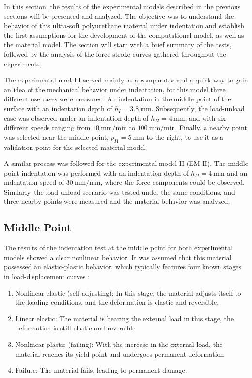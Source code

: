 In this section, the results of the experimental models described in the previous 
sections will be presented and analyzed. The objective was to understand the behavior 
of this ultra-soft polyurethane material under indentation and establish the first 
assumptions for the development of the computational model, as well as the material model.
The section will start with a brief summary of the tests, followed by the analysis of the 
force-stroke curves gathered throughout the experiments.

The experimental model I served mainly as a comparator and a quick way to gain an idea of the 
mechanical behavior under indentation, for this model three different use cases were measured. 
An indentation in the middle point of the surface with an indentation depth of $h_{I} = \SI{3.8}{\milli \m}$. 
Subsequently, the load-unload case was observed under an indentation depth of  $h_{I2} = \SI{4}{\milli \m}$, and 
with six different speeds ranging from $\SI[per-mode = symbol]{10}{\milli \m\per \minute}$ to 
$\SI[per-mode = symbol]{100}{\milli \m\per \minute}$. 
Finally, a nearby point was selected near the middle point, $p_{I1} = \SI{5}{\milli \m}$ to the right,
to use it as a validation point for the selected material model. 

A similar process was followed for the experimental model II (EM II). The middle point indentation was 
performed with an indentation depth of $h_{II} = \SI{4}{\milli \m}$ and an indentation 
speed of $\SI[per-mode = symbol]{30}{\milli \m\per \minute}$, where the force components 
could be observed. Similarly, the load-unload scenario was tested under the same conditions, and three 
nearby points were measured and the material behavior was analyzed.

\subsection{Middle Point}
\label{subsection:midpointresult}
The results of the indentation test at the middle point for both experimental models showed a clear 
nonlinear behavior.  It was assumed that this material 
possessed an elastic-plastic behavior, which typically features four known stages in load-displacement curves \cite{Goharian2017}:

\begin{enumerate}
    \item Nonlinear elastic (self-adjusting): In this stage, the material adjusts itself to the loading conditions, and the deformation is elastic and reversible.
    \item Linear elastic: The material is bearing the external load in this stage, the deformation is still elastic and reversible 
    \item Nonlinear plastic (failing): With the increase in the external load, the material reaches its yield point and undergoes permanent deformation
    \item Failure: The material fails, leading to permanent damage.
\end{enumerate}


